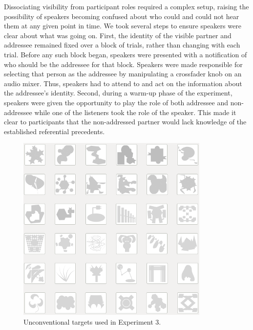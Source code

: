 \documentclass[natbib,doc,a4paper]{apa6}
\begin{document}
Dissociating visibility from participant roles required a complex setup, raising the possibility of speakers becoming confused about who could and could not hear them at any given point in time. We took several steps to ensure speakers were clear about what was going on. First, the identity of the visible partner and addressee remained fixed over a block of trials, rather than changing with each trial. Before any such block began, speakers were presented with a notification of who should be the addressee for that block. Speakers were made responsible for selecting that person as the addressee by manipulating a crossfader knob on an audio mixer. Thus, speakers had to attend to and act on the information about the addressee's identity. Second, during a warm-up phase of the experiment, speakers were given the opportunity to play the role of both addressee and non-addressee while one of the listeners took the role of the speaker. This made it clear to participants that the non-addressed partner would lack knowledge of the established referential precedents. 

\begin{figure}[htbp]
\centering
\includegraphics[width=.9\linewidth]{figs/Exp3_unconv.png}
\caption{\label{fig:orgc157a65}
Unconventional targets used in Experiment 3.}
\end{figure}
\end{document}
